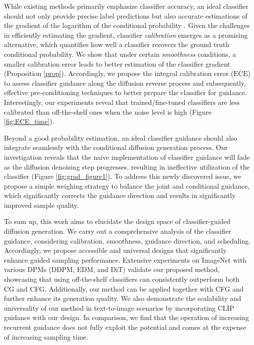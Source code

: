 \documentclass{article}
\theoremstyle{definition}
\begin{document}
While existing methods primarily emphasize classifier accuracy, an ideal classifier should not only provide precise label predictions but also accurate estimations of the gradient of the logarithm of the conditional probability \citep{dhariwal2021diffusion, ho2022classifier,chen2022sampling}. Given the challenges in efficiently estimating the gradient, classifier \textit{calibration} emerges as a promising alternative, which quantifies how well a classifier recovers the ground truth conditional probability. 
We show that under certain \textit{smoothness} conditions, a smaller calibration error leads to better estimation of the classifier gradient (Proposition \ref{prop}). 
Accordingly, we propose the integral calibration error ($\overline{\text{ECE}}$) to assess classifier guidance along the diffusion reverse process and subsequently, effective pre-conditioning techniques to better prepare the classifier for guidance. 
Interestingly, our experiments reveal that trained/fine-tuned classifiers \citep{dhariwal2021diffusion} are less calibrated than off-the-shelf ones when the noise level is high (Figure \ref{fig:ECE_time}). 


Beyond a good probability estimation, an ideal classifier guidance should also integrate seamlessly with the conditional diffusion generation process. 
Our investigation reveals that the naive implementation of classifier guidance will fade as the diffusion denoising step progresses, resulting in ineffective utilization of the classifier (Figure \ref{fig:grad_figure1}). 
To address this newly discovered issue, we propose a simple weighing strategy to balance the joint and conditional guidance, which significantly corrects the guidance direction and results in significantly improved sample quality. 

To sum up, this work aims to elucidate the design space of classifier-guided diffusion generation. 
We carry out a comprehensive analysis of the classifier guidance, considering calibration, smoothness, guidance direction, and scheduling. Accordingly, we propose accessible and universal designs that significantly enhance guided sampling performance.
Extensive experiments on ImageNet with various DPMs (DDPM, EDM, and DiT) validate our proposed method, showcasing that using off-the-shelf classifiers can consistently outperform both CG and CFG. 
Additionally, our method can be applied together with CFG and further enhance its generation quality.
We also demonstrate the scalability and universality of our method in text-to-image scenarios by incorporating CLIP \citep{radford2021learning} guidance with our design.  
In comparison, we find that the operation of increasing recurrent guidance \citep{bansal2023universal} does not fully exploit the potential and comes at the expense of increasing sampling time. 
\end{document}
